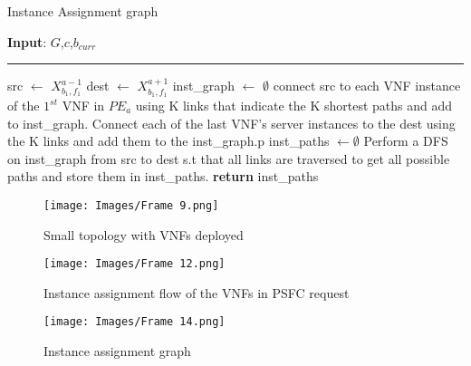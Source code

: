 \documentclass[journal]{IEEEtran}
\begin{document}
\begin{algorithm}
\caption{Instance Assignment graph}\label{inst graph}
\textbf{Input}: $G$,$c$,$b_{curr}$\\
\hrule
\begin{algorithmic}[1]
    \State src $\leftarrow$ $X^{a-1}_{b_1,f_1}$
    \State dest $\leftarrow$ $X^{a+1}_{b_1,f_1}$
    \State inst\_graph $\leftarrow$ $\emptyset$
    \State connect src to each VNF instance of the $1^{st}$ VNF in $PE_a$ using K links that indicate the K shortest paths and add to inst\_graph.
    \State Connect each of the last VNF's server instances to the dest using the K links and add them to the inst\_graph.p
    \State inst\_paths $\leftarrow \emptyset$
    \State Perform a DFS on inst\_graph from src to dest s.t that all links are traversed to get all possible paths and store them in inst\_paths.    
    \State \textbf{return} inst\_paths
\end{algorithmic}
\end{algorithm}

\begin{figure}[!htb]
\centering
\texttt{[image: Images/Frame 9.png]}
\caption{Small topology with VNFs deployed}
\label{toy topology}
\vspace{0.4cm}
\end{figure}

\begin{figure}[!htb]
\centering
\texttt{[image: Images/Frame 12.png]}
\caption{Instance assignment flow of the VNFs in PSFC request}
\label{PSFC request}
\vspace{0.4cm}
\end{figure}

\begin{figure}[!htb]
\centering
\texttt{[image: Images/Frame 14.png]}
\caption{Instance assignment graph}
\label{l_graph}
\vspace{0.4cm}
\end{figure}
\end{document}
